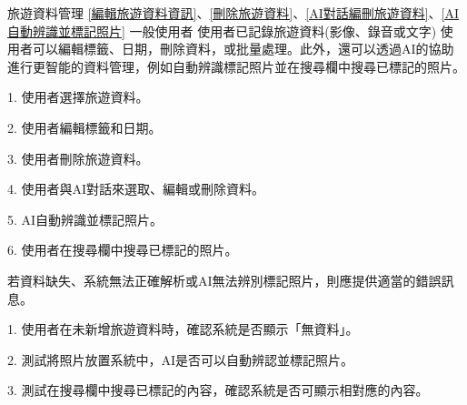 \addUsecase
  {旅遊資料管理}
  {\ref{編輯旅遊資料資訊}、\ref{刪除旅遊資料}、\ref{AI對話編刪旅遊資料}、\ref{AI自動辨識並標記照片}}
  {一般使用者}
  {使用者已記錄旅遊資料(影像、錄音或文字)}
  {使用者可以編輯標籤、日期，刪除資料，或批量處理。此外，還可以透過AI的協助進行更智能的資料管理，例如自動辨識標記照片並在搜尋欄中搜尋已標記的照片。}
  {
    1. 使用者選擇旅遊資料。

    2. 使用者編輯標籤和日期。

    3. 使用者刪除旅遊資料。

    4. 使用者與AI對話來選取、編輯或刪除資料。

    5. AI自動辨識並標記照片。

    6. 使用者在搜尋欄中搜尋已標記的照片。
  }
  {若資料缺失、系統無法正確解析或AI無法辨別標記照片，則應提供適當的錯誤訊息。}
  {
    1. 使用者在未新增旅遊資料時，確認系統是否顯示「無資料」。

    2. 測試將照片放置系統中，AI是否可以自動辨認並標記照片。

    3. 測試在搜尋欄中搜尋已標記的內容，確認系統是否可顯示相對應的內容。
  }

\usecaseTable

